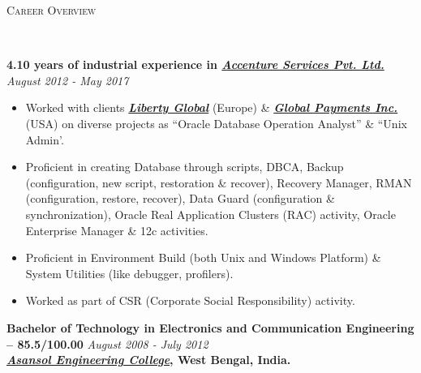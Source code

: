 \documentclass[9pt]{article}
\newenvironment{changemargin}[2]{%
  \begin{list}{}{%
    \setlength{\topsep}{0pt}%
    \setlength{\leftmargin}{#1}%
    \setlength{\rightmargin}{#2}%
    \setlength{\listparindent}{\parindent}%
    \setlength{\itemindent}{\parindent}%
    \setlength{\parsep}{\parskip}%
  }%
  \item[]}{\end{list}
}
\newcommand{\lineover}{
	\begin{changemargin}{-0.05in}{-0.05in}
		\vspace*{-8pt}
		\hrulefill \\
		\vspace*{-2pt}
	\end{changemargin}
}
\newcommand{\header}[1]{
	\begin{changemargin}{-0.5in}{-0.5in}
		\scshape{#1}\\
  	\lineover
	\end{changemargin}
}
\newenvironment{body} {
	\vspace*{-16pt}
	\begin{changemargin}{-0.25in}{-0.5in}
  }
	{\end{changemargin}
}
\begin{document}
\smallskip


\header{Career Overview}

\begin{body}
	\vspace{14pt}

	\textbf{4.10 years of industrial experience in  {\emph{\href{https://www.accenture.com/in-en/accenture-services-private-limited}{Accenture Services Pvt. Ltd.}}}} \hfill \emph{August 2012 - May 2017} \\
	\begin{itemize} \itemsep -0pt
            \item  Worked with clients \textbf{\emph{\href{http://www.libertyglobal.com}{Liberty Global}}} (Europe) \& \textbf{\emph{\href{https://www.globalpaymentsinc.com/en-us}{Global Payments Inc.}}} (USA) on diverse projects as ``Oracle Database Operation Analyst'' \& ``Unix Admin'.
            \item Proficient in creating Database through scripts, DBCA, Backup (configuration, new
script, restoration \& recover), Recovery Manager, RMAN (configuration, restore,
recover), Data Guard (configuration \& synchronization), Oracle Real Application
Clusters (RAC) activity, Oracle Enterprise Manager \& 12c activities.
            \item Proficient in Environment Build (both Unix and Windows Platform) \& System Utilities
(like debugger, profilers).
            \item Worked as part of CSR (Corporate Social Responsibility) activity.
        \end{itemize}

  \medskip
	\textbf{Bachelor of Technology in Electronics and Communication Engineering -- 85.5/100.00} \hfill \emph{August 2008 - July 2012} \\
	\textbf{\emph{\href{http://www.aecwb.edu.in/index.php/}{Asansol Engineering College}}, West Bengal, India.}\\
\end{body}

\smallskip
\end{document}
